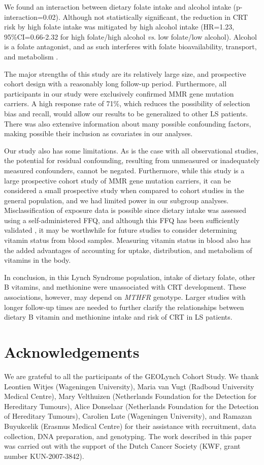 \noindent We found an interaction between dietary folate intake and alcohol intake (p-interaction=0.02). Although not statistically significant, the reduction in CRT risk by high folate intake was mitigated by high alcohol intake (HR=1.23, 95\%CI=0.66-2.32 for high folate/high alcohol \emph{vs}. low folate/low alcohol). Alcohol is a folate antagonist, and as such interferes with folate bioavailability, transport, and metabolism \cite{c650}.

\noindent The major strengths of this study are its relatively large size, and prospective cohort design with a reasonably long follow-up period. Furthermore, all participants in our study were exclusively confirmed MMR gene mutation carriers. A high response rate of 71\%, which reduces the possibility of selection bias and recall, would allow our results to be generalized to other LS patients. There was also extensive information about many possible confounding factors, making possible their inclusion as covariates in our analyses.

\noindent Our study also has some limitations. As is the case with all observational studies, the potential for residual confounding, resulting from unmeasured or inadequately measured confounders, cannot be negated. Furthermore, while this study is a large prospective cohort study of MMR gene mutation carriers, it can be considered a small prospective study when compared to cohort studies in the general population, and we had limited power in our subgroup analyses. Misclassification of exposure data is possible since dietary intake was assessed using a self-administered FFQ, and although this FFQ has been sufficiently validated \cite{c628,c629}, it may be worthwhile for future studies to consider determining vitamin status from blood samples. Measuring vitamin status in blood also has the added advantages of accounting for uptake, distribution, and metabolism of vitamins in the body.

\noindent In conclusion, in this Lynch Syndrome population, intake of dietary folate, other B vitamins, and methionine were unassociated with CRT development. These associations, however, may depend on \emph{MTHFR} genotype. Larger studies with longer follow-up times are needed to further clarify the relationships between dietary B vitamin and methionine intake and risk of CRT in LS patients. 

\section*{Acknowledgements} 
\noindent We are grateful to all the participants of the GEOLynch Cohort Study. We thank Leontien Witjes (Wageningen University), Maria van Vugt (Radboud University Medical Centre), Mary Velthuizen (Netherlands Foundation for the Detection for Hereditary Tumours), Alice Donselaar (Netherlands Foundation for the Detection of Hereditary Tumours), Carolien Lute (Wageningen University), and Ramazan Buyukcelik (Erasmus Medical Centre) for their assistance with recruitment, data collection, DNA preparation, and genotyping. The work described in this paper was carried out with the support of the Dutch Cancer Society (KWF, grant number KUN-2007-3842). 
 
